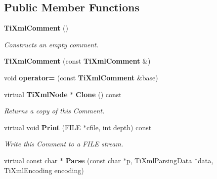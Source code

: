 \subsection*{Public Member Functions}
\begin{CompactItemize}
\item 
{\bf Ti\-Xml\-Comment} ()\label{classTiXmlComment_TiXmlCommenta0}

\begin{CompactList}\small\item\em Constructs an empty comment. \item\end{CompactList}\item 
{\bf Ti\-Xml\-Comment} (const {\bf Ti\-Xml\-Comment} \&)\label{classTiXmlComment_TiXmlCommenta1}

\item 
void {\bf operator=} (const {\bf Ti\-Xml\-Comment} \&base)\label{classTiXmlComment_TiXmlCommenta2}

\item 
virtual {\bf Ti\-Xml\-Node} $\ast$ {\bf Clone} () const\label{classTiXmlComment_TiXmlCommenta4}

\begin{CompactList}\small\item\em Returns a copy of this Comment. \item\end{CompactList}\item 
virtual void {\bf Print} (FILE $\ast$cfile, int depth) const\label{classTiXmlComment_TiXmlCommenta5}

\begin{CompactList}\small\item\em Write this Comment to a FILE stream. \item\end{CompactList}\item 
virtual const char $\ast$ {\bf Parse} (const char $\ast$p, Ti\-Xml\-Parsing\-Data $\ast$data, Ti\-Xml\-Encoding encoding)\label{classTiXmlComment_TiXmlCommenta6}


\end{CompactItemize}
